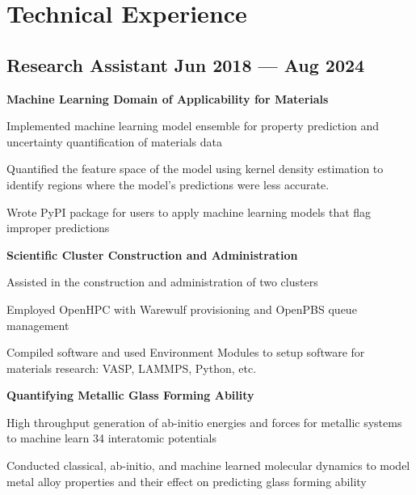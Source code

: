 \section{Technical Experience}

\subsection{{Research Assistant \hfill Jun 2018 --- Aug 2024}}
\begin{zitemize}
\item[] \textbf{Machine Learning Domain of Applicability for Materials}
    \begin{zitemize}
    \item Implemented machine learning model ensemble for property prediction and uncertainty quantification of materials data
    \item Quantified the feature space of the model using kernel density estimation to identify regions where the model's predictions were less accurate.
    \item Wrote PyPI package for users to apply machine learning models that flag improper predictions
    \end{zitemize}
\item[] \textbf{Scientific Cluster Construction and Administration}
    \begin{zitemize}
    \item Assisted in the construction and administration of two clusters
    \item Employed OpenHPC with Warewulf provisioning and OpenPBS queue management
    \item Compiled software and used Environment Modules to setup software for materials research: VASP, LAMMPS, Python, etc.
    \end{zitemize}
\item[] \textbf{Quantifying Metallic Glass Forming Ability}
    \begin{zitemize}
    \item High throughput generation of ab-initio energies and forces for metallic systems to machine learn 34 interatomic potentials
    \item Conducted classical, ab-initio, and machine learned molecular dynamics to model metal alloy properties and their effect on predicting glass forming ability
    \end{zitemize}
\end{zitemize}

